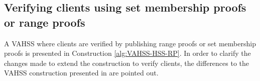 \begin{comment}
The correctness follows from the correctness of range proofs and by proving that $\sigma= \prod_{i=1}^n \pi_i \:\bigwedge\: \prod_{i=1}^n \pi_i = \mathcal{H}(y)$. Both $y$ and $\sigma$ are the same as in Construction \ref{alg:VAHSS-HSS}, hence by construction:
\begin{align}
    \label{eq:y=sum(x_ij)}
    y = \sum_{j=1}^m y_j= \sum_{j=1}^m \sum_{i=1}^n \lambda_{ij}p_i(\theta_{ij}) = \sum_{i=1}^n \overbrace{ \Big (\sum_{j=1}^m \lambda_{ij}p_i(\theta_{ij}) \Big)}^{ p_i(0)} = \sum_{i=1}^n p_i(0) = \sum_{i=1}^n x_i,
\end{align}
and for $\sigma$ it holds that:
\begin{align*}
    \sigma = \prod_{j=1}^m \sigma_j = \prod_{j=1}^m g^{y_j} = g^{\sum_{j=1}^my_j} =g^y = \mathcal{H}(y)
\end{align*}
For the $\pi_i$, whose construction has been modified compared to $\tau_i$ in  Construction\ref{alg:VAHSS-HSS}, thus it follows that:
\begin{align*}
    &\prod_{i=1}^n \pi_i = \prod_{i=1}^n \mathds{E}(x_i,R_i)= \prod_{i=1}^n g^{x_i}h^{R_i} = g^{\sum_{i=1}^n x_i } h^{\sum_{i=1}^n R_i} \overset{\eqref{eq:y=sum(x_ij)}}{=} g^y h^{\sum_{i=1}^{n-1} R_i+R_n} = \\ 
    &= g^y h^{ \phi(N)\big\lceil \frac{\sum_{i=1}^{n-1}R_i}{\phi(N) }\big\rceil} = g^y = \mathcal{H}(y) 
\end{align*}

The proof of security argument for malicious servers given in \cite{SumItUp} is still sufficient since the Pedersen commitment is perfectly hiding and computationally binding and that the range proofs are zero-knowledge. The security argument for malicious clients follows from the soundness of the range proof and that the secret hidden in the commitment has to be the same as the secret in the shares, as argued above. . 

The proof of \textit{\textbf{Verifiability Severs}} is the same as the proof given in  in \cite{SumItUp}, except that the commitments $\pi_i$ replaces the checksums $\tau_i$.  \textit{\textbf{Verifiability Clients}} follows from the properties of the range proof.
\end{comment}

\subsection*{Verifying clients using set membership proofs or range proofs}
A VAHSS where clients are verified by publishing range proofs or set membership proofs is presented in Construction \ref{alg:VAHSS-HSS-RP}.  In order to clarify the changes made to extend the construction to  verify clients, the differences to the VAHSS construction presented in \cite{SumItUp} are pointed out.

